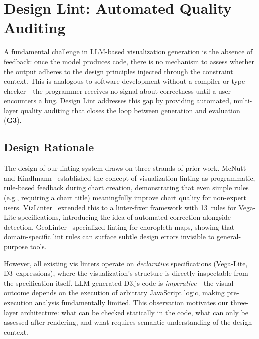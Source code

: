 \section{Design Lint: Automated Quality Auditing}
\label{sec:lint}

A fundamental challenge in LLM-based visualization generation is the absence of feedback: once the model produces code, there is no mechanism to assess whether the output adheres to the design principles injected through the constraint context. This is analogous to software development without a compiler or type checker---the programmer receives no signal about correctness until a user encounters a bug. Design Lint addresses this gap by providing automated, multi-layer quality auditing that closes the loop between generation and evaluation (\textbf{G3}).

\subsection{Design Rationale}

The design of our linting system draws on three strands of prior work. McNutt and Kindlmann~\cite{mcnutt2018vislint} established the concept of visualization linting as programmatic, rule-based feedback during chart creation, demonstrating that even simple rules (e.g., requiring a chart title) meaningfully improve chart quality for non-expert users. VizLinter~\cite{chen2022vizlinter} extended this to a linter-fixer framework with 13~rules for Vega-Lite specifications, introducing the idea of automated correction alongside detection. GeoLinter~\cite{lei2024geolinter} specialized linting for choropleth maps, showing that domain-specific lint rules can surface subtle design errors invisible to general-purpose tools.

However, all existing vis linters operate on \textit{declarative} specifications (Vega-Lite, D3~expressions), where the visualization's structure is directly inspectable from the specification itself. LLM-generated D3.js code is \textit{imperative}---the visual outcome depends on the execution of arbitrary JavaScript logic, making pre-execution analysis fundamentally limited. This observation motivates our three-layer architecture: what can be checked statically in the code, what can only be assessed after rendering, and what requires semantic understanding of the design context.

